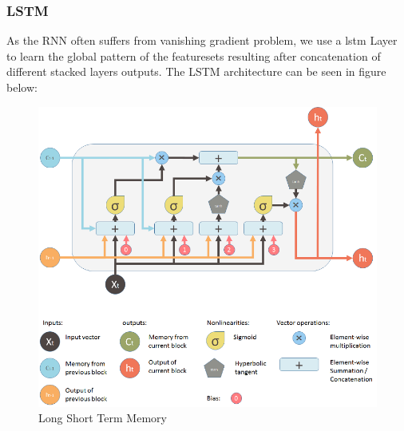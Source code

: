 \subsubsection{LSTM}
As the RNN often suffers from vanishing gradient problem, we use a \acrshort{lstm} Layer to learn the global pattern of the featuresets resulting after concatenation of different stacked layers outputs. The LSTM architecture can be seen in figure below:
\begin{figure}
  [ht]
  \centering
  \includegraphics[width=.5\linewidth]{mainmatter/3-Methodology/images/LSTMBlockDiagram.png}
  \caption{Long Short Term Memory}
  \label{fig:lstm}
\end{figure}



